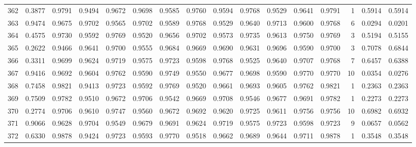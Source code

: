 \begin{tabular}{lrrrrrrrrrrrrrrr}
362 &      0.3877 &  0.9791 &  0.9494 &  0.9672 &  0.9698 &  0.9585 &  0.9760 &  0.9594 &  0.9768 &  0.9529 &   0.9641 &     0.9791 &      1 &                    0.5914 &                     0.5914 \\
363 &      0.9474 &  0.9675 &  0.9702 &  0.9565 &  0.9702 &  0.9589 &  0.9768 &  0.9529 &  0.9640 &  0.9713 &   0.9600 &     0.9768 &      6 &                    0.0294 &                     0.0201 \\
364 &      0.4575 &  0.9730 &  0.9592 &  0.9769 &  0.9520 &  0.9656 &  0.9702 &  0.9573 &  0.9735 &  0.9613 &   0.9750 &     0.9769 &      3 &                    0.5194 &                     0.5155 \\
365 &      0.2622 &  0.9466 &  0.9641 &  0.9700 &  0.9555 &  0.9684 &  0.9669 &  0.9690 &  0.9631 &  0.9696 &   0.9590 &     0.9700 &      3 &                    0.7078 &                     0.6844 \\
366 &      0.3311 &  0.9699 &  0.9624 &  0.9719 &  0.9575 &  0.9723 &  0.9598 &  0.9768 &  0.9525 &  0.9640 &   0.9707 &     0.9768 &      7 &                    0.6457 &                     0.6388 \\
367 &      0.9416 &  0.9692 &  0.9604 &  0.9762 &  0.9590 &  0.9749 &  0.9550 &  0.9677 &  0.9698 &  0.9590 &   0.9770 &     0.9770 &     10 &                    0.0354 &                     0.0276 \\
368 &      0.7458 &  0.9821 &  0.9413 &  0.9723 &  0.9592 &  0.9769 &  0.9520 &  0.9661 &  0.9693 &  0.9605 &   0.9762 &     0.9821 &      1 &                    0.2363 &                     0.2363 \\
369 &      0.7509 &  0.9782 &  0.9510 &  0.9672 &  0.9706 &  0.9542 &  0.9669 &  0.9708 &  0.9546 &  0.9677 &   0.9691 &     0.9782 &      1 &                    0.2273 &                     0.2273 \\
370 &      0.2774 &  0.9706 &  0.9610 &  0.9747 &  0.9560 &  0.9672 &  0.9692 &  0.9620 &  0.9725 &  0.9611 &   0.9756 &     0.9756 &     10 &                    0.6982 &                     0.6932 \\
371 &      0.9066 &  0.9628 &  0.9704 &  0.9549 &  0.9679 &  0.9691 &  0.9624 &  0.9719 &  0.9575 &  0.9723 &   0.9598 &     0.9723 &      9 &                    0.0657 &                     0.0562 \\
372 &      0.6330 &  0.9878 &  0.9424 &  0.9723 &  0.9593 &  0.9770 &  0.9518 &  0.9662 &  0.9689 &  0.9644 &   0.9711 &     0.9878 &      1 &                    0.3548 &                     0.3548 \\

\end{tabular}
